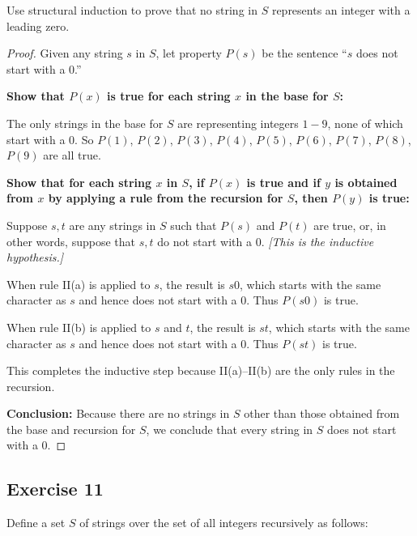 \documentclass[14pt]{extarticle}
\begin{document}
Use structural induction to prove that no string in $S$ represents an integer with a leading zero.

\begin{proof}
    Given any string $s$ in $S$, let property $P(s)$ be the sentence “$s$ does not start with a 0.”

    {\bf Show that $P(x)$ is true for each string $x$ in the base for $S$:}

    The only strings in the base for $S$ are representing integers $1-9$, none of which start with a 0. So $P(1)$,
    $P(2)$, $P(3)$, $P(4)$, $P(5)$, $P(6)$, $P(7)$, $P(8)$, $P(9)$ are all true.

        {\bf Show that for each string $x$ in $S$, if $P(x)$ is true and if $y$ is obtained from $x$ by applying a rule
            from the recursion for $S$, then $P(y)$ is true:}

    Suppose $s, t$ are any strings in $S$ such that $P(s)$ and $P(t)$ are true, or, in other words, suppose that $s, t$ do
    not start with a 0. {\it [This is the inductive hypothesis.]}

    When rule II(a) is applied to $s$, the result is $s0$, which starts with the same character as $s$ and hence does
    not start with a 0. Thus $P(s0)$ is true.

    When rule II(b) is applied to $s$ and $t$, the result is $st$, which starts with the same character as $s$ and hence
    does not start with a 0. Thus $P(st)$ is true.

    This completes the inductive step because II(a)–II(b) are the only rules in the recursion.

        {\bf Conclusion:} Because there are no strings in $S$ other than those obtained from the base and recursion for $S$, we
    conclude that every string in $S$ does not start with a 0.
\end{proof}

\subsection{Exercise 11}
Define a set $S$ of strings over the set of all integers recursively as follows:
\end{document}
